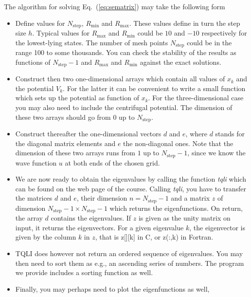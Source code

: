 The algorithm for solving Eq.\ (\ref{eq:sematrix})  may take the following 
form 
\begin{itemize}
  \item Define values for $N_{\mathrm{step}}$, $R_{\mathrm{min}}$ and $R_{\mathrm{max}}$.
        These values define in turn the step size $h$. Typical values for
        $R_{\mathrm{max}}$ and $R_{\mathrm{min}}$ could be $10$ and $-10$ respectively for the lowest-lying states.  
        The number of mesh points $N_{\mathrm{step}}$ could be in the range 100 to some
        thousands. You can check the stability of the results as functions of 
        $N_{\mathrm{step}}-1$ and $R_{\mathrm{max}}$ and $R_{\mathrm{min}}$
        against the exact solutions. 
  \item Construct then two one-dimensional arrays which contain all values of $x_k$ 
        and the potential $V_k$. For the latter it can be convenient to write a
        small function which sets up the potential as function of $x_k$. For 
        the three-dimensional case you may also need to include 
        the centrifugal potential. The dimension
        of these two arrays should go from $0$ up to $N_{\mathrm{step}}$. 
  \item Construct thereafter the one-dimensional vectors $d$ and $e$, where 
        $d$ stands for the diagonal matrix elements and $e$ the non-diagonal ones.
        Note that the dimension of these two arrays runs from $1$ up to
        $N_{\mathrm{step}}-1$, since we know the wave function $u$ at both ends of the
        chosen grid.   
  \item We are now ready to obtain the eigenvalues by calling the function {\em tqli }
        which can be found on the web page of the course.
        Calling {\em tqli}, you have to transfer the 
        matrices $d$ and $e$, their 
        dimension $n=N_{\mathrm{step}}-1$ and a matrix $z$ of dimension
        $N_{\mathrm{step}}-1\times N_{\mathrm{step}}-1$ which returns the eigenfunctions.
        On return, the array $d$ contains the 
        eigenvalues. If $z$ is given as the unity matrix on input, it returns the 
       eigenvectors. For a given eigenvalue $k$, the eigenvector is given by the column
       $k$ in $z$, that is z[][k] in C, or z(:,k) in Fortran.
   \item TQLI does however not return an ordered sequence of eigenvalues. You may
         then need to sort them as e.g., an ascending series of numbers.
         The program we provide includes a sorting function as well. 
   \item Finally, you may perhaps need to plot the eigenfunctions as well,

\end{itemize}
